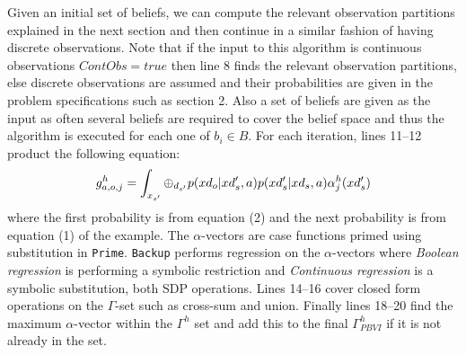 \documentclass{article} %
\begin{document}
Given an initial set of beliefs, we can compute the relevant observation partitions explained in the next section and then continue in a similar fashion of having discrete observations. %
Note that if the input to this algorithm is continuous observations $ContObs=true$ then line 8 finds the relevant observation partitions, else discrete observations are assumed and their probabilities are given in the problem specifications such as section 2. Also a set of beliefs are given as the input as often several beliefs are required to cover the belief space and thus the algorithm is executed for each one of $b_i \in B$.
For each iteration, lines 11--12 product the following equation: 
{\footnotesize
\vspace{-2mm}
\begin{align}
g^h_{a,o,j} =  \int_{x_{s'}} \large \oplus_{d_{s'}} p(xd_o|xd'_s,a)p(xd'_s|xd_s,a) \alpha^h_j(xd'_s) \nonumber
\end{align}
}
where the first probability is from equation (2) and the next probability is from equation (1) of the example. The $\alpha$-vectors are case functions primed using substitution in \texttt{Prime}. \texttt{Backup} performs regression on the $\alpha$-vectors where \textit{Boolean regression} is performing a symbolic restriction and \textit{Continuous regression} is a symbolic substitution, both SDP operations. 
Lines 14--16 cover closed form operations on the $\Gamma$-set such as cross-sum and union. Finally lines 18--20 find the maximum $\alpha$-vector within the $\Gamma^h$ set and add this to the final $\Gamma_{PBVI}^h$ if it is not already in the set. 
\end{document}
